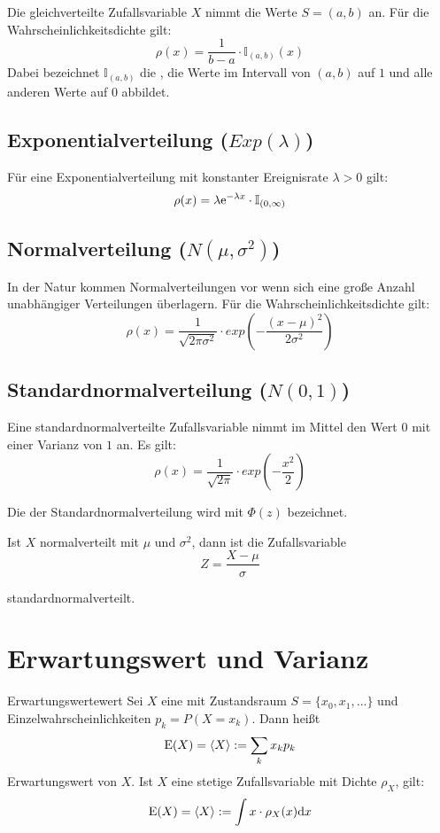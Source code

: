 Die gleichverteilte Zufallsvariable $X$ nimmt die Werte $S=(a,b)$ an. Für die
Wahrscheinlichkeitsdichte gilt:
\[
\rho(x) = \frac{1}{b-a}\cdot\mathbb{I}_{(a,b)}(x)
\]
Dabei bezeichnet $\mathbb{I}_{(a,b)}$ die , die Werte im
Intervall von $(a,b)$ auf $1$ und alle anderen Werte auf $0$ abbildet.

\subsection{Exponentialverteilung ($Exp(\lambda)$)}

Für eine Exponentialverteilung mit konstanter Ereignisrate $\lambda>0$ gilt:
\[
\rho(x) = \lambda \mathrm{e}^{-\lambda x}\cdot\mathbb{I}_{(0, \infty)}
\]

\subsection{Normalverteilung ($N(\mu, \sigma^2)$)}

In der Natur kommen Normalverteilungen vor wenn sich eine große Anzahl
unabhängiger Verteilungen überlagern. Für die Wahrscheinlichkeitsdichte gilt:
\[
\rho(x) = \frac{1}{\sqrt{2\pi\sigma^2}}\cdot exp(-\frac{(x-\mu)^2}{2\sigma^2})
\]

\subsection{Standardnormalverteilung ($N(0,1)$)}

Eine standardnormalverteilte Zufallsvariable nimmt im Mittel den Wert $0$ mit
einer Varianz von $1$ an. Es gilt:
\[
\rho(x) = \frac{1}{\sqrt{2\pi}}\cdot exp(-\frac{x^2}{2})
\]

Die  der Standardnormalverteilung wird mit $\Phi(z)$ bezeichnet.

Ist $X$ normalverteilt mit $\mu$ und $\sigma^2$, dann ist die Zufallsvariable
\[
Z=\frac{X-\mu}{\sigma}
\]

standardnormalverteilt.

\section{Erwartungswert und Varianz}

\begin{definition}{Erwartungswert}{ewert}
Sei $X$ eine  mit Zustandsraum $S=\{x_0, x_1,
...\}$ und Einzelwahrscheinlichkeiten $p_k=P(X=x_k)$. Dann heißt
\[
\operatorname{E}(X) =\langle X\rangle := \sum_k x_kp_k
\]
Erwartungswert von $X$. Ist $X$ eine stetige Zufallsvariable mit Dichte
$\rho_X$, gilt:
\[
\operatorname{E}(X) =\langle X\rangle := \int x\cdot\rho_X(x)\mathrm{d}x
\]
\end{definition}

